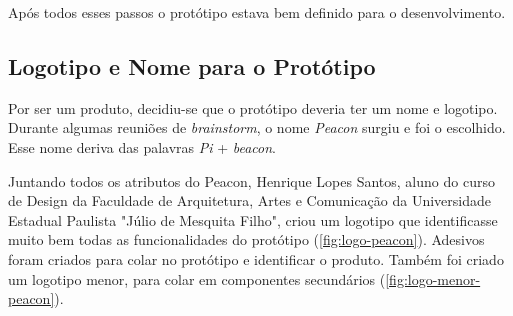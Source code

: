 Após todos esses passos o protótipo estava bem definido para o desenvolvimento.

\subsection{Logotipo e Nome para o Protótipo}\label{sec:logotipo-prototipo}

Por ser um produto, decidiu-se que o protótipo deveria ter um nome e logotipo. Durante algumas reuniões de \textit{brainstorm}, o nome \textit{Peacon} surgiu e foi o escolhido. Esse nome deriva das palavras \textit{Pi}  + \textit{beacon}.

Juntando todos os atributos do Peacon, Henrique Lopes Santos, aluno do curso de Design da Faculdade de Arquitetura, Artes e Comunicação da Universidade Estadual Paulista "Júlio de Mesquita Filho", criou um logotipo que identificasse muito bem todas as funcionalidades do protótipo (\autoref{fig:logo-peacon}). Adesivos foram criados para colar no protótipo e identificar o produto. Também foi criado um logotipo menor, para colar em componentes secundários (\autoref{fig:logo-menor-peacon}).


